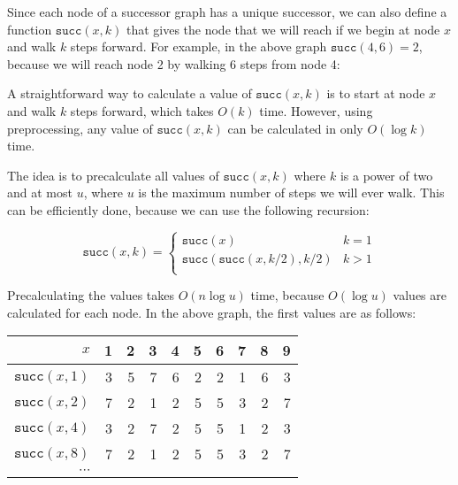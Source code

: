 Since each node of a successor graph has a
unique successor, we can also define a function $\texttt{succ}(x,k)$
that gives the node that we will reach if
we begin at node $x$ and walk $k$ steps forward.
For example, in the above graph $\texttt{succ}(4,6)=2$,
because we will reach node 2 by walking 6 steps from node 4:

\begin{center}
\end{center}

A straightforward way to calculate a value of $\texttt{succ}(x,k)$
is to start at node $x$ and walk $k$ steps forward, which takes $O(k)$ time.
However, using preprocessing, any value of $\texttt{succ}(x,k)$
can be calculated in only $O(\log k)$ time.

The idea is to precalculate all values of $\texttt{succ}(x,k)$ where
$k$ is a power of two and at most $u$, where $u$ is
the maximum number of steps we will ever walk.
This can be efficiently done, because
we can use the following recursion:

\begin{equation*}
    \texttt{succ}(x,k) = \begin{cases}
               \texttt{succ}(x)              & k = 1\\
               \texttt{succ}(\texttt{succ}(x,k/2),k/2)   & k > 1\\
           \end{cases}
\end{equation*}

Precalculating the values takes $O(n \log u)$ time,
because $O(\log u)$ values are calculated for each node.
In the above graph, the first values are as follows:

\begin{center}
\begin{tabular}{r|rrrrrrrrr}
$x$ & 1 & 2 & 3 & 4 & 5 & 6 & 7 & 8 & 9 \\
\hline
$\texttt{succ}(x,1)$ & 3 & 5 & 7 & 6 & 2 & 2 & 1 & 6 & 3 \\
$\texttt{succ}(x,2)$ & 7 & 2 & 1 & 2 & 5 & 5 & 3 & 2 & 7 \\
$\texttt{succ}(x,4)$ & 3 & 2 & 7 & 2 & 5 & 5 & 1 & 2 & 3 \\
$\texttt{succ}(x,8)$ & 7 & 2 & 1 & 2 & 5 & 5 & 3 & 2 & 7 \\
$\cdots$ \\
\end{tabular}
\end{center}

